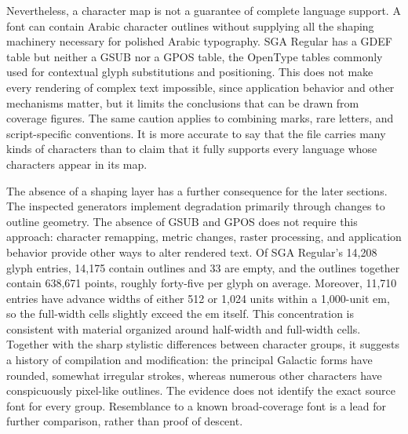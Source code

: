 \documentclass[11pt]{article}
\begin{document}
Nevertheless, a character map is not a guarantee of complete language support. A font can contain Arabic character outlines without supplying all the shaping machinery necessary for polished Arabic typography. SGA Regular has a GDEF table but neither a GSUB nor a GPOS table, the OpenType tables commonly used for contextual glyph substitutions and positioning. This does not make every rendering of complex text impossible, since application behavior and other mechanisms matter, but it limits the conclusions that can be drawn from coverage figures. The same caution applies to combining marks, rare letters, and script-specific conventions. It is more accurate to say that the file carries many kinds of characters than to claim that it fully supports every language whose characters appear in its map.

The absence of a shaping layer has a further consequence for the later sections. The inspected generators implement degradation primarily through changes to outline geometry. The absence of GSUB and GPOS does not require this approach: character remapping, metric changes, raster processing, and application behavior provide other ways to alter rendered text. Of SGA Regular's 14,208 glyph entries, 14,175 contain outlines and 33 are empty, and the outlines together contain 638,671 points, roughly forty-five per glyph on average. Moreover, 11,710 entries have advance widths of either 512 or 1,024 units within a 1,000-unit em, so the full-width cells slightly exceed the em itself. This concentration is consistent with material organized around half-width and full-width cells. Together with the sharp stylistic differences between character groups, it suggests a history of compilation and modification: the principal Galactic forms have rounded, somewhat irregular strokes, whereas numerous other characters have conspicuously pixel-like outlines. The evidence does not identify the exact source font for every group. Resemblance to a known broad-coverage font is a lead for further comparison, rather than proof of descent.
\end{document}
